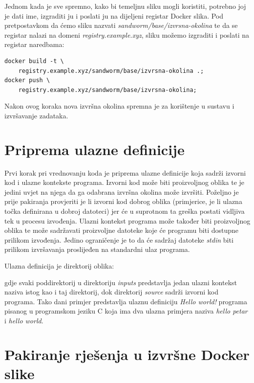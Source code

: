 \documentclass[times, utf8, zavrsni]{fer}
\begin{document}
{{{\begin{appendices}
Jednom kada je sve spremno, kako bi temeljnu sliku mogli koristiti, potrebno joj je dati ime, izgraditi ju i poslati ju na dijeljeni registar Docker slika. Pod pretpostavkom da ćemo sliku nazvati {\textit{sandworm/base/izvrsna-okolina}} te da se registar nalazi na domeni {\textit{registry.example.xyz}}, sliku možemo izgraditi i poslati na registar naredbama:

\begin{lstlisting}
docker build -t \
	registry.example.xyz/sandworm/base/izvrsna-okolina .;
docker push \
	registry.example.xyz/sandworm/base/izvrsna-okolina;
\end{lstlisting}

Nakon ovog koraka nova izvršna okolina spremna je za korištenje u sustavu i izvršavanje zadataka.

\section{Priprema ulazne definicije}

Prvi korak pri vrednovanju koda je priprema ulazne definicije koja sadrži izvorni kod i ulazne kontekste programa. Izvorni kod može biti proizvoljnog oblika te je jedini uvjet na njega da ga odabrana izvršna okolina može izvršiti. Poželjno je prije pakiranja provjeriti je li izvorni kod dobrog oblika (primjerice, je li ulazna točka definirana u dobroj datoteci) jer će u suprotnom ta greška postati vidljiva tek u procesu izvođenja. Ulazni kontekst programa može također biti proizvoljnog oblika te može sadržavati proizvoljne datoteke koje će programu biti dostupne prilikom izvođenja. Jedino ograničenje je to da će sadržaj datoteke {\textit{stdin}} biti prilikom izvršavanja proslijeđen na standardni ulaz programa.

Ulazna definicija je direktorij oblika:


gdje svaki poddirektorij u direktoriju {\textit{inputs}} predstavlja jedan ulazni kontekst naziva istog kao i taj direktorij, dok direktorij {\textit{source}} sadrži izvorni kod programa. Tako dani primjer predstavlja ulaznu definiciju {\textit{Hello world!}} programa pisanog u programskom jeziku C koja ima dva ulazna primjera naziva {\textit{hello petar}} i {\textit{hello world}}.

\section{Pakiranje rješenja u izvršne Docker slike}


\end{appendices}}}}
\end{document}
